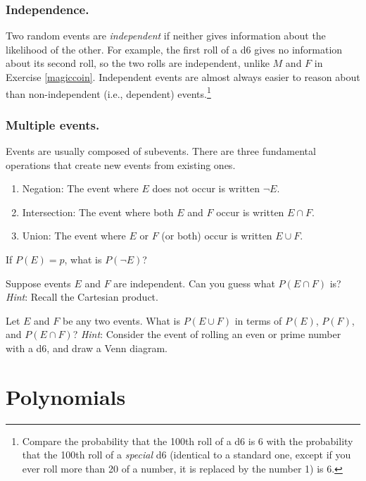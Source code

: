 \documentclass{book}
\begin{document}
\subsubsection*{Independence.}
Two random events are \emph{independent} if neither gives information about the likelihood of the other. For example, the first roll of a d6 gives no information about its second roll, so the two rolls are independent, unlike $M$ and $F$ in Exercise \ref{magiccoin}. Independent events are almost always easier to reason about than non-independent (i.e., dependent) events.\footnote{Compare the probability that the 100th roll of a d6 is 6 with the probability that the 100th roll of a \emph{special} d6 (identical to a standard one, except if you ever roll more than 20 of a number, it is replaced by the number 1) is 6.}

\subsubsection*{Multiple events.}
Events are usually composed of subevents. There are three fundamental operations that create new events from existing ones.
\begin{enumerate}[label = (\arabic*)]
\item Negation: The event where $E$ does not occur is written $\neg E$.
\item\label{intersection} Intersection:
The event where both $E$ and $F$ occur is written $\displaystyle E \cap F$.
\item Union:  The event where $E$ or $F$ (or both) occur is written $E \cup F$.
\end{enumerate}

\begin{exercise}\label{q:neg}
If $P(E) = p$, what is $P(\neg E)$?
\end{exercise}
\begin{exercise}\label{q:cap}
Suppose events $E$ and $F$ are independent. Can you guess what $\displaystyle P(E \cap F)$ is? \emph{Hint}: Recall the Cartesian product.
\end{exercise}
\begin{exercise}\label{q:cup}
Let $E$ and $F$ be any two events. What is $P(E \cup F)$ in terms of $P(E)$, $P(F)$, and $\displaystyle P(E \cap F)$? \emph{Hint}: Consider the event of rolling an even or prime number with a d6, and draw a Venn diagram.
\end{exercise}


\section{Polynomials}
\end{document}
